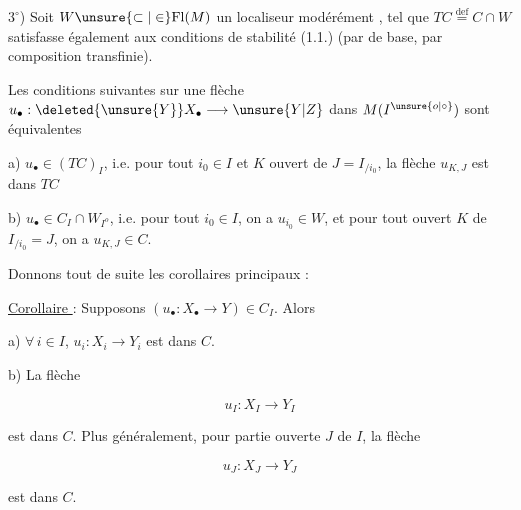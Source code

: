 
$3^\circ$)  Soit $W\unsure{\subset|\in}\mathrm{Fl}(M)$ un localiseur modérément , tel que  $TC\overset{\mathrm{def}}{=}C\cap W$ satisfasse également aux conditions de stabilité (1.1.) (par  de base, par composition transfinie).


Les conditions suivantes sur une flèche $u_\bullet:\deleted{\unsure{Y}}X_\bullet\longrightarrow\unsure{Y|Z}$ dans $M(I^{\unsure{o|\circ}})$ sont équivalentes

a) $u_\bullet\in(TC)_I$, i.e. pour tout $i_0\in I$ et $K$ ouvert de $J=I_{/i_0}$, la flèche $u_{K,J}$ est dans $TC$

b) $u_\bullet\in C_I\cap W_{I^o}$, i.e.  pour tout $i_0\in I$, on a $u_{i_0}\in W$, et pour tout ouvert $K$ de $I_{/i_0}=J$, on a $u_{K,J}\in C$.

Donnons tout de suite les corollaires principaux :

\uline{Corollaire }: Supposons $(u_\bullet:X_\bullet\longrightarrow Y)\in C_I$. Alors

a) $\forall\,i\in I$, $u_i:X_i\longrightarrow Y_i$ est dans $C$.

b) \deleted{\unsure{$\forall$}} La flèche

\[
 u_I:X_I\longrightarrow Y_I\tag*{(2.2.1.)}
\]

est dans $C$. Plus généralement, pour  partie ouverte $J$ de $I$, la flèche

\[
 u_J:X_J\longrightarrow Y_J\tag*{(2.2.2)}
\]

est dans $C$.


